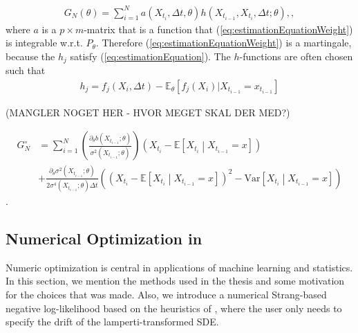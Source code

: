 \begin{align}
    G_N(\theta) = \sum_{i = 1}^N a\left(X_{t_i}, \Delta t, \theta \right)h(X_{t_{i - 1}}, X_{t_i}, \Delta t; \theta), \label{eq:estimationEquationWeight},
\end{align}
where $a$ is a $p\times m$-matrix that is a function that (\ref{eq:estimationEquationWeight}) is integrable w.r.t. $P_\theta$. Therefore (\ref{eq:estimationEquationWeight}) is a martingale, because the $h_j$ satisfy (\ref{eq:estimationEquation}). The $h$-functions are often chosen such that
\begin{align}
    h_j = f_j(X_i, \Delta t) - \mathbb{E}_\theta\left[f_j(X_i)| X_{t_{i - 1}} = x_{t_{i - 1}}\right]
\end{align}

(MANGLER NOGET HER - HVOR MEGET SKAL DER MED?)


\begin{align}
    G_N^{\circ} &= \sum_{i = 1}^N 
    \left(
        \frac{\partial_\theta b\left(X_{t_{i-1}};\theta\right)}{\sigma^2\left(X_{t_{i-1}};\theta\right)}
    \right) \left(X_{t_{i}} - \mathbb{E}\left[X_{t_{i}} \middle| X_{t_{i-1}} = x\right]\right) \nonumber \\
    &+ \frac{\partial_\theta\sigma^2\left(X_{t_{i-1}}; \theta\right)}{2\sigma^4\left(X_{t_{i - 1}}; \theta\right)\Delta t}\left(\left(X_{t_{i}} - \mathbb{E}\left[X_{t_{i}} \middle| X_{t_{i-1}} = x\right]\right)^2 - \textrm{Var}\left[X_{t_{i}} \middle| X_{t_{i-1}} = x\right]\right) \label{eq:approximatelyOptimalMartingale}
\end{align}
\cite[Example 1.11]{StatisticalMethodsForSDE}.

\subsection{Numerical Optimization in }
Numeric optimization is central in applications of machine learning and statistics. In this section, we mention the methods used in the thesis and some motivation for the choices that was made. Also, we introduce a numerical Strang-based negative log-likelihood based on the heuristics of \cite{SplittingSchemes}, where the user only needs to specify the drift of the lamperti-transformed SDE.
